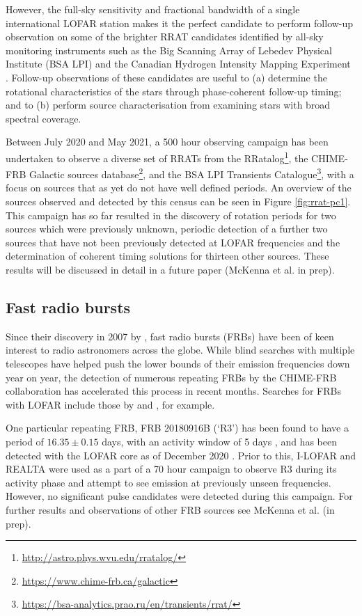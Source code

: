 However, the full-sky sensitivity and fractional bandwidth of a single international LOFAR station makes it the perfect candidate to perform follow-up observation on some of the brighter RRAT candidates identified by all-sky monitoring instruments such as the Big Scanning Array of Lebedev Physical Institute (BSA LPI) and the Canadian Hydrogen Intensity Mapping Experiment \citep[CHIME;][]{Amiri2018}. Follow-up observations of these candidates are useful to (a) determine the rotational characteristics of the stars through phase-coherent follow-up timing; and to (b) perform source characterisation from examining stars with broad spectral coverage.

Between July 2020 and May 2021, a 500 hour observing campaign has been undertaken to observe a diverse set of RRATs from the RRatalog\footnote{\hyperref[RRatalog]{http://astro.phys.wvu.edu/rratalog/}}, the CHIME-FRB Galactic sources database\footnote{\hyperref[CHIME-FRB Galactic Sources]{https://www.chime-frb.ca/galactic}}, and the BSA LPI Transients Catalogue\footnote{\hyperref[BSA LPI Transients Catalogue]{https://bsa-analytics.prao.ru/en/transients/rrat/}}, with a focus on sources that as yet do not have well defined periods. An overview of the sources observed and detected by this census can be seen in Figure \ref{fig:rrat-pc1}. This campaign has so far resulted in the discovery of rotation periods for two sources which were previously unknown, periodic detection of a further two sources that have not been previously detected at LOFAR frequencies and the determination of coherent timing solutions for thirteen other sources. These results will be discussed in detail in a future paper (McKenna et al. in prep).%


\subsection{Fast radio bursts}
Since their discovery in 2007 by \citeauthor{Lorimer2007}, fast radio bursts (FRBs) have been of keen interest to radio astronomers across the globe. While blind searches with multiple telescopes have helped push the lower bounds of their emission frequencies down year on year, the detection of numerous repeating FRBs by the CHIME-FRB collaboration \citep{CHIME2019} has accelerated this process in recent months. Searches for FRBs with LOFAR include those by \cite{Karastergiou2015} and \cite{TerVeen2019}, for example.

One particular repeating FRB, FRB 20180916B (`R3') has been found to have a period of $16.35\pm 0.15$ days, with an activity window of 5 days \citep{Amiri2020}, and has been detected with the LOFAR core as of December 2020 \citep{Pastor-Marazuela2020, Pleunis2021}. Prior to this, I-LOFAR and REALTA were used as a part of a 70 hour campaign to observe R3 during its activity phase and attempt to see emission at previously unseen frequencies. However, no significant pulse candidates were detected during this campaign. For further results and observations of other FRB sources see McKenna et al. (in prep).

